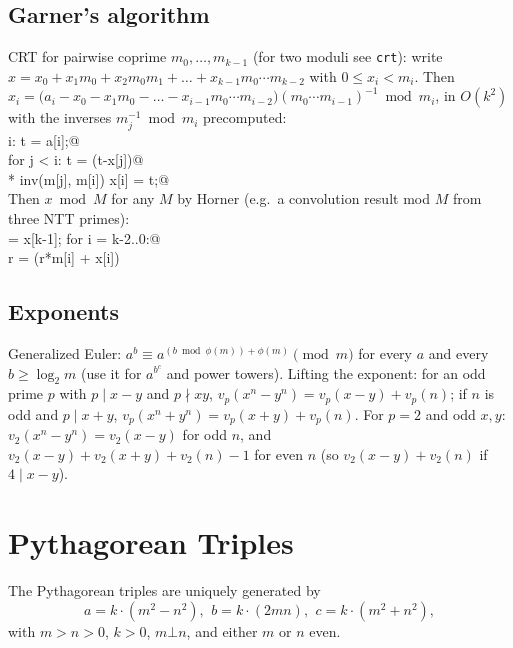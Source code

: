 	\subsection{Garner's algorithm}
		CRT for pairwise coprime $m_0, \dots, m_{k-1}$ (for two moduli see \texttt{crt}): write $x = x_0 + x_1 m_0 + x_2 m_0 m_1 + \dots + x_{k-1} m_0 \cdots m_{k-2}$ with $0 \le x_i < m_i$. Then
		$x_i = \bigl(a_i - x_0 - x_1 m_0 - \dots - x_{i-1} m_0 \cdots m_{i-2}\bigr)(m_0 \cdots m_{i-1})^{-1} \bmod m_i$, in $O(k^2)$ with the inverses $m_j^{-1} \bmod m_i$ precomputed:\\
		\verb@for i: t = a[i];@\\
		\verb@  for j < i: t = (t-x[j])@\\
		\verb@    * inv(m[j], m[i]) % m[i];@\\
		\verb@  x[i] = t;@\\
		Then $x \bmod M$ for any $M$ by Horner (e.g.\ a convolution result mod $M$ from three NTT primes):\\
		\verb@r = x[k-1]; for i = k-2..0:@\\
		\verb@  r = (r*m[i] + x[i]) % M;@

	\subsection{Exponents}
		Generalized Euler: $a^b \equiv a^{(b \bmod \phi(m)) + \phi(m)} \pmod m$ for every $a$ and every $b \ge \log_2 m$ (use it for $a^{b^c}$ and power towers).
		Lifting the exponent: for an odd prime $p$ with $p \mid x - y$ and $p \nmid xy$, $v_p(x^n - y^n) = v_p(x-y) + v_p(n)$;
		if $n$ is odd and $p \mid x + y$, $v_p(x^n + y^n) = v_p(x+y) + v_p(n)$.
		For $p = 2$ and odd $x, y$: $v_2(x^n - y^n) = v_2(x-y)$ for odd $n$, and $v_2(x-y) + v_2(x+y) + v_2(n) - 1$ for even $n$ (so $v_2(x-y) + v_2(n)$ if $4 \mid x - y$).


\section{Pythagorean Triples}
 The Pythagorean triples are uniquely generated by
 \[ a=k\cdot (m^{2}-n^{2}),\ \,b=k\cdot (2mn),\ \,c=k\cdot (m^{2}+n^{2}), \]
 with $m > n > 0$, $k > 0$, $m \bot n$, and either $m$ or $n$ even.

